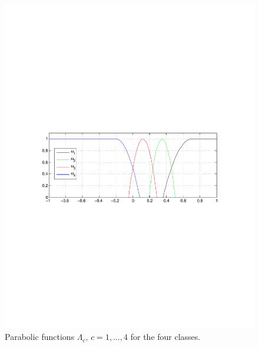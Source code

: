 \documentclass[a4paper, 10pt, conference]{ieeeconf}      %
\begin{document}
\begin{figure}[t]
      \centering
      \includegraphics[trim = 30mm 108mm 30mm 110mm, clip,width=0.99\linewidth]{../images/parabola_omega.pdf}
      \caption{Parabolic functions $\Lambda_c,\, c=1,\ldots, 4$ for the four classes.}
       \label{fig:parabola}
   \end{figure}


\end{document}
